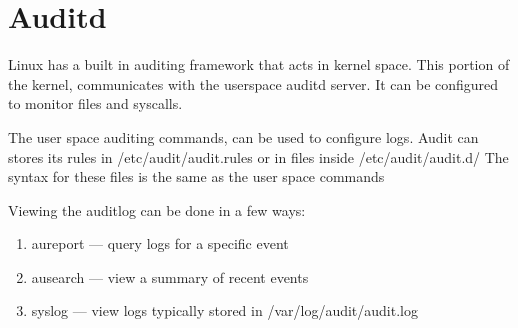 \section{Auditd}

Linux has a built in auditing framework that acts in kernel space.
This portion of the kernel, communicates with the userspace auditd server.
It can be configured to monitor files and syscalls.


The user space auditing commands, can be used to configure logs.
Audit can stores its rules in /etc/audit/audit.rules or in files inside /etc/audit/audit.d/
The syntax for these files is the same as the user space commands


Viewing the auditlog can be done in a few ways:

\begin{enumerate}
	\item aureport --- query logs for a specific event
	\item ausearch --- view a summary of recent events
	\item syslog --- view logs typically stored in /var/log/audit/audit.log
\end{enumerate}
